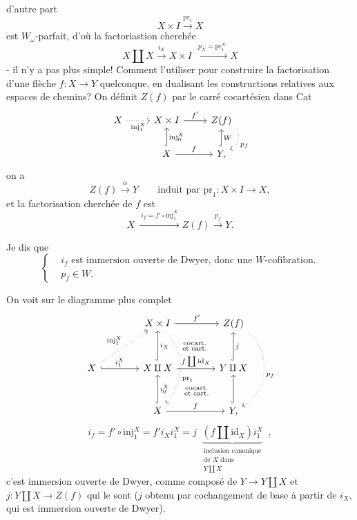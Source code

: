 \documentclass[11pt]{article}
\newcommand{\printedpage}[1]{\marginpar{\footnotesize p.~#1}}
\newcommand{\msp}[1]{\marginpar{\footnotesize [#1]}}
\begin{document}
\printedpage{146}
\msp{page 229}
d'autre part
\[
X \times I \xrightarrow{\mathrm{pr}_1} X
\]
est $W_\omega$-parfait, d'où la factoriastion cherchée %
\[
X \amalg X \xrightarrow{i_X} X \times I \ \xrightarrow{\ p_X = \mathrm{pr}_1^X\ } X
\]
- il n'y a pas plus simple! Comment l'utiliser pour construire la factorisation d'une flèche $f : X \longrightarrow Y$ quelconque, en dualisant les constructions relatives aux espaces de chemins? On définit $Z(f)$ par le carré cocartésien dans Cat
\[
\begin{tikzcd}[ampersand replacement=\&]
X \arrow[r, dotted, "\mathrm{inj}_1^X"'] \& X \times I \arrow[r, "f'"] \& Z(f) \arrow[d, dotted, bend left=60, "p_f"] \\
\& X \arrow[u, hook, "\mathrm{inj}_0^X"'] \arrow[r, "f"] \& Y, \arrow[u, hook, "W"']
\end{tikzcd}
\]
on a
\[
Z(f) \xrightarrow{\alpha} Y \qquad \text{induit par } \mathrm{pr}_1 : X \times I \longrightarrow X,
\]
et la factorisation cherchée de $f$ est
\[
X \ \xrightarrow{\ i_f = f' \circ \mathrm{inj}_1^X\ } Z(f) \xrightarrow{p_f} Y.
\]

Je dis que
\[
\left\{
\begin{aligned}
& i_f \text{ est immersion ouverte de Dwyer, donc une } W\text{-cofibration.} \\
& p_f \in W.
\end{aligned}
\right.
\]

\msp{page 230}
On voit sur le diagramme plus complet
\[
\begin{tikzcd}[ampersand replacement=\&, column sep=4em, row sep=3em]
\& X \times I \arrow[r, "f'"] \arrow[dd, dotted, bend left=45, "\mathrm{pr}_1"{pos=.60}] \arrow[dr, phantom, "\substack{\text{cocart.}\\ \text{et cart.}}"] \& Z(f) \arrow[dd, dotted, bend left=60, "p_f"] \\
X \arrow[ur, dotted, "\mathrm{inj}_1^X"] \arrow[r, hook, "i_1^X"] \& X \amalg X \arrow[u, hook, "i_X"'] \arrow[r, "f \coprod \mathrm{id}_X"] \arrow[dr, phantom, "\substack{\text{cocart.}\\ \text{et cart.}}"] \& Y \amalg X \arrow[u, hook, "j"'] \\
\& X \arrow[u, hook, "i_0^X"'] \arrow[r, "f"] \& Y, \arrow[u, hook]
\end{tikzcd}
\]
\printedpage{147}
\[
i_f = f' \circ \mathrm{inj}_1^X = f' i_X i_1^X = j \ \ \underbrace{(f \amalg \mathrm{id}_X) i_1^X}_{\substack{\text{inclusion canonique}\\ \text{de } X \text{ dans}\\ Y \coprod X}} \ \ ,
\]
c'est immersion ouverte de Dwyer, comme composé de $Y \longrightarrow Y \amalg X$ et $j : Y \amalg X \longrightarrow Z(f)$ qui le sont ($j$ obtenu par cochangement de base à partir de $i_X$, qui est immersion ouverte de Dwyer).
\end{document}
